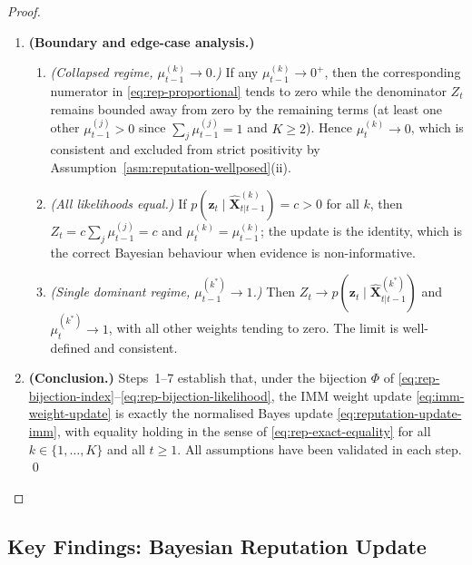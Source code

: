\documentclass[12pt,openany]{book}
\numberwithin{equation}{chapter}
\theoremstyle{plain}
\theoremstyle{definition}
\theoremstyle{remark}
\begin{document}
\begin{proof}
\begin{enumerate}
  \item \textbf{(Boundary and edge-case analysis.)}
        \begin{enumerate}
          \item \emph{(Collapsed regime, $\mu_{t-1}^{(k)}\to 0$.)}
                If any $\mu_{t-1}^{(k)} \to 0^+$, then the
                corresponding numerator in \eqref{eq:rep-proportional}
                tends to zero while the denominator $Z_t$ remains
                bounded away from zero by the remaining terms
                (at least one other $\mu_{t-1}^{(j)} > 0$ since
                $\sum_j \mu_{t-1}^{(j)} = 1$ and $K\geq 2$).
                Hence $\mu_t^{(k)} \to 0$, which is
                consistent and excluded from strict positivity by
                Assumption~\ref{asm:reputation-wellposed}(ii).
          \item \emph{(All likelihoods equal.)}
                If
                $p(\mathbf{z}_t \mid \hat{\mathbf{X}}_{t|t-1}^{(k)})
                = c > 0$ for all $k$, then $Z_t = c \sum_j
                \mu_{t-1}^{(j)} = c$ and
                $\mu_t^{(k)} = \mu_{t-1}^{(k)}$; the update is
                the identity, which is the correct Bayesian
                behaviour when evidence is non-informative.
          \item \emph{(Single dominant regime,
                $\mu_{t-1}^{(k^*)}\to 1$.)}
                Then $Z_t \to p(\mathbf{z}_t \mid
                \hat{\mathbf{X}}_{t|t-1}^{(k^*)})$ and
                $\mu_t^{(k^*)} \to 1$, with all other weights
                tending to zero.  The limit is well-defined and
                consistent.
        \end{enumerate}

  \item \textbf{(Conclusion.)}
        Steps~1--7 establish that, under the bijection $\Phi$
        of \eqref{eq:rep-bijection-index}--\eqref{eq:rep-bijection-likelihood},
        the IMM weight update \eqref{eq:imm-weight-update} is
        exactly the normalised Bayes update
        \eqref{eq:reputation-update-imm}, with equality holding
        in the sense of \eqref{eq:rep-exact-equality} for all
        $k \in \{1,\ldots,K\}$ and all $t \geq 1$.
        All assumptions have been validated in each step.
        \qed

\end{enumerate}
\end{proof}

\subsection{Key Findings: Bayesian Reputation Update}
\end{document}
